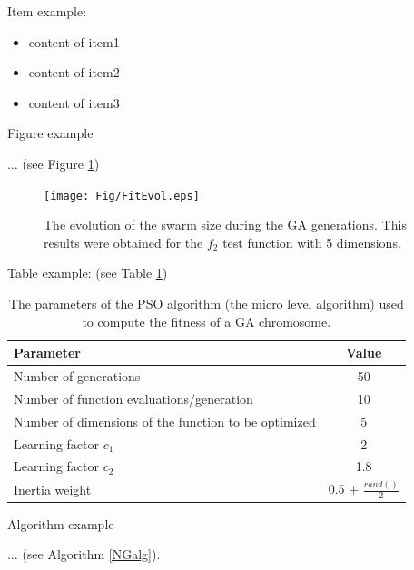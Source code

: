 \documentclass[runningheads,a4paper,11pt]{report}
\begin{document}
Item example: 

\begin{itemize}
	\item content of item1
 	\item content of item2
 	\item content of item3
\end{itemize}



Figure example 

$\ldots$ (see Figure \ref{swarmsize})

\begin{figure}[htbp]
	\centerline{\texttt{[image: Fig/FitEvol.eps]}}  
	\caption{The evolution of the swarm size during the GA generations. This results were obtained for the $f_2$ test function with 5 dimensions.}
	\label{swarmsize}
\end{figure}


Table example: (see Table \ref{tab3PSO})


\begin{table}[htbp]
	\caption{The parameters of the PSO algorithm (the micro level algorithm) used to compute the fitness of a GA chromosome.}
	\label{tab3PSO}
		\begin{center}
			\begin{tabular}{p{220pt}c}

				\textbf{Parameter}& \textbf{Value} \\
				\hline\hline
 				Number of generations& 50 \\
 				Number of function evaluations/generation& 10 \\
 				Number of dimensions of the function to be optimized& 5 \\
 				Learning factor $c_{1}$& 2 \\
 				Learning factor $c_{2}$ & 1.8\\
 				Inertia weight& 0.5 + $\frac{rand()}{2}$\\
		
			\end{tabular}
		\end{center}
\end{table}

Algorithm example 

$\ldots$ (see Algorithm \ref{NGalg}).


\end{document}
